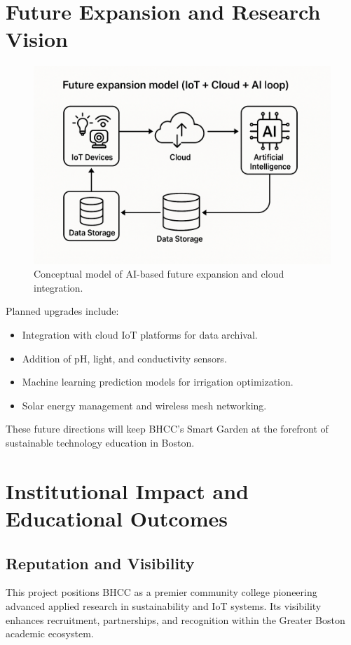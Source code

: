\documentclass[12pt,a4paper]{article}
\begin{document}
\section{Future Expansion and Research Vision}

\begin{figure}[H]\centering
\includegraphics[width=0.9\linewidth]{ai_future_expansion.png}
\caption{Conceptual model of AI-based future expansion and cloud integration.}
\end{figure}

Planned upgrades include:
\begin{itemize}
  \item Integration with cloud IoT platforms for data archival.
  \item Addition of pH, light, and conductivity sensors.
  \item Machine learning prediction models for irrigation optimization.
  \item Solar energy management and wireless mesh networking.
\end{itemize}

These future directions will keep BHCC’s Smart Garden at the forefront of sustainable technology education in Boston.

\clearpage
\section{Institutional Impact and Educational Outcomes}

\subsection{Reputation and Visibility}
This project positions BHCC as a premier community college pioneering advanced applied research in sustainability and IoT systems. Its visibility enhances recruitment, partnerships, and recognition within the Greater Boston academic ecosystem.
\end{document}
